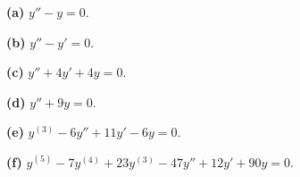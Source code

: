 \noindent\textbf{(a)} $y''-y=0$.

\noindent\textbf{(b)} $y''-y'=0$.

\noindent\textbf{(c)} $y''+4y'+4y=0$.

\noindent\textbf{(d)} $y''+9y=0$.

\noindent\textbf{(e)} $y^{(3)}-6y''+11y'-6y=0$.

\noindent\textbf{(f)} $y^{(5)}-7y^{(4)}+23y^{(3)}-47y''+12y'+90y=0$.
